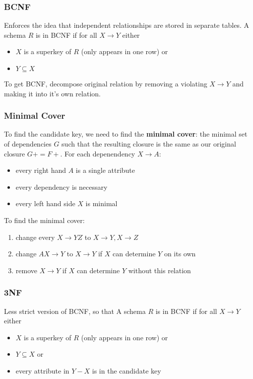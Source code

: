 \documentclass[]{article}
\theoremstyle{definition}
\begin{document}
	\subsubsection{BCNF}
	Enforces the idea that independent relationships are stored in separate tables. A schema $R$ is in BCNF if for all $X \rightarrow Y$ either
	\begin{itemize}
		\item $X$ is a superkey of $R$ (only appears in one row) or 
		\item $Y \subseteq X$ 
	\end{itemize}

	To get BCNF, decompose original relation by removing a violating $X \rightarrow Y$ and making it into it's own relation.

	\subsubsection{Minimal Cover}
	To find the candidate key, we need to find the \textbf{minimal cover}: the minimal set of dependencies $G$ such that 
	the resulting closure is the same as our original closure $G+ = F+$. For each depenendency $X \rightarrow A$:
	\begin{itemize}
		\item every right hand $A$ is a single attribute
		\item every dependency is necessary
		\item every left hand side $X$ is minimal
	\end{itemize}

	To find the minimal cover:
	\begin{enumerate}
		\item change every $X \rightarrow YZ$ to $X \rightarrow Y, X \rightarrow Z$
		\item change $AX \rightarrow Y$ to $X \rightarrow Y$ if $X$ can determine $Y$ on its own
		\item remove $X \rightarrow Y$ if $X$ can determine $Y$ without this relation
	\end{enumerate}

	\subsubsection{3NF}
	Less strict version of BCNF, so that A schema $R$ is in BCNF if for all $X \rightarrow Y$ either
	\begin{itemize}
		\item $X$ is a superkey of $R$ (only appears in one row) or 
		\item $Y \subseteq X$ or 
		\item every attribute in $Y - X$ is in the candidate key 
	\end{itemize}
\end{document}
